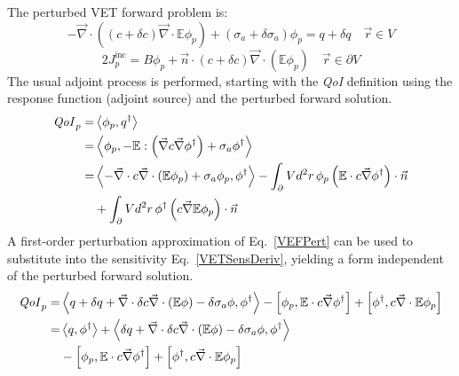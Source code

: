 \documentclass[12pt]{report}
\newcommand{\vr}{\vec{r}}
\newcommand{\bra}{\left\langle}
\newcommand{\ket}{\right\rangle}
\newcommand{\sbra}{\left[}
\newcommand{\sket}{\right]}
\renewcommand{\div}{\vec{\nabla} \cdot}
\newcommand{\grad}{\vec{\nabla}}
\newcommand{\domain}{V}
\newcommand{\bound}{\partial V}
\newcommand{\vn}{\vec{n}}
\newcommand{\Edd}{\mathbb{E}}
\newcommand{\siga}{\sigma_a}
\newcommand{\isigt}{c}
\newcommand{\scalSource}{q}
\newcommand{\scalResp}{q^\dag}
\newcommand{\qoi}{{\it QoI}\xspace}
\begin{document}
The perturbed VET forward problem is:
\begin{subequations}
\begin{equation}
\label{VEFPert}
- \div \left((\isigt + \delta \isigt)\div \Edd \phi_p \right) + (\siga + \delta \siga)\phi_p = \scalSource + \delta \scalSource  \quad \vr \in \domain
\end{equation}
\end{subequations}
\begin{subequations}
\begin{equation}
 2J_p^\text{inc} = B \phi_p  + \vn \cdot  (\isigt + \delta \isigt) \vec{\nabla} \cdot \left(\Edd \phi_p \right)  \quad \vr \in \bound
\end{equation}
\end{subequations}
The usual adjoint process is performed, starting with the \qoi definition using the response function (adjoint source) and the perturbed forward solution. 
\begin{equation}
\label{VETSensDeriv}
\begin{split}
\qoi_p = &\bra \phi_p , \scalResp \ket \\
       = &\bra \phi_p , - \Edd : \left( \grad \isigt \grad \phi^\dag \right) + \siga \phi^\dag \ket \\
       = & \bra - \div \isigt \div \left( \Edd \phi_p \right) + \siga \phi_p, \phi^\dag \ket 
 - \int_\bound d^2 r \, \phi_p \left( \Edd \cdot \isigt \grad \phi^\dag \right) \cdot \vec{n}  \\ 
&+ \int_\bound d^2 r \, \phi^\dag \left(  \isigt \grad \Edd \phi_p \right) \cdot \vec{n} \\
\end{split}
\end{equation}
A first-order perturbation approximation of Eq.~\eqref{VEFPert} can be used to substitute into the sensitivity Eq.~\eqref{VETSensDeriv}, yielding a form independent of the perturbed forward solution.
\begin{equation}
\label{QoIVETAdjNoBC}
\begin{split}
\qoi_p =& \bra \scalSource + \delta \scalSource + \div \delta \isigt \div \left( \Edd \phi \right) - \delta \siga \phi, \phi^\dag \ket - \sbra \phi_p, \Edd \cdot \isigt \grad \phi^\dag \sket + \sbra \phi^\dag, \isigt \div \Edd \phi_p \sket \\
=& \bra q, \phi^\dag \ket  + \bra \delta \scalSource + \div \delta \isigt \div \left( \Edd \phi \right)  - \delta \siga \phi, \phi^\dag \ket \\
& - \sbra \phi_p, \Edd \cdot \isigt \grad \phi^\dag \sket + \sbra \phi^\dag, \isigt \div \Edd \phi_p \sket 
\end{split}
\end{equation}
\end{document}
